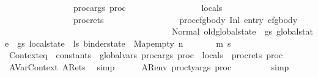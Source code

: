 \begin{isabellebody}
\ \ \ \ \ \ \ \ \ \ \ \ \ \ \ \ proc{\isacharunderscore}{\kern0pt}args\ proc\ {\isacharat}{\kern0pt}\isanewline
\ \ \ \ \ \ \ \ \ \ \ \ \ \ \ \ locals\ {\isacharat}{\kern0pt}\isanewline
\ \ \ \ \ \ \ \ \ \ \ \ \ \ \ \ proc{\isacharunderscore}{\kern0pt}rets\isanewline
\ \ \ \ \ \ \ \ \ \ \ \ \ \ \ \ \ proc{\isacharparenright}{\kern0pt}{\isacharcomma}{\kern0pt}{\isasymGamma}{\isacharcomma}{\kern0pt}{\isasymOmega}{\isacharcomma}{\kern0pt}cfg{\isacharunderscore}{\kern0pt}body\ {\isasymturnstile}{\isacharparenleft}{\kern0pt}Inl\ {\isacharparenleft}{\kern0pt}entry\ cfg{\isacharunderscore}{\kern0pt}body{\isacharparenright}{\kern0pt}{\isacharcomma}{\kern0pt}\isanewline
\ \ \ \ \ \ \ \ \ \ \ \ \ \ \ \ \ \ \ \ \ \ \ \ \ \ \ \ \ \ \ \ \ \ \ \ \ \ \ Normal\ {\isasymlparr}old{\isacharunderscore}{\kern0pt}global{\isacharunderscore}{\kern0pt}state\ {\isacharequal}{\kern0pt}\ gs{\isacharcomma}{\kern0pt}\ global{\isacharunderscore}{\kern0pt}state\ {\isacharequal}{\kern0pt}\ gs{\isacharcomma}{\kern0pt}\ local{\isacharunderscore}{\kern0pt}state\ {\isacharequal}{\kern0pt}\ ls{\isacharcomma}{\kern0pt}\ binder{\isacharunderscore}{\kern0pt}state\ {\isacharequal}{\kern0pt}\ Map{\isachardot}{\kern0pt}empty{\isasymrparr}{\isacharparenright}{\kern0pt}\ {\isacharminus}{\kern0pt}n{\isasymrightarrow}{\isacharasterisk}{\kern0pt}\isanewline
\ \ \ \ \ \ \ {\isacharparenleft}{\kern0pt}m{\isacharprime}{\kern0pt}{\isacharcomma}{\kern0pt}\ s{\isacharprime}{\kern0pt}{\isacharparenright}{\kern0pt}{\isachardoublequoteclose}\isanewline
\ \ \ \ \isamarkupfalse%
\ Contexteq{\isacharcolon}{\kern0pt}{\isachardoublequoteopen}{\isasymLambda}\ {\isacharequal}{\kern0pt}\ {\isacharparenleft}{\kern0pt}constants\ {\isacharat}{\kern0pt}\ global{\isacharunderscore}{\kern0pt}vars{\isacharcomma}{\kern0pt}\ proc{\isacharunderscore}{\kern0pt}args\ proc\ {\isacharat}{\kern0pt}\ locals\ {\isacharat}{\kern0pt}\ proc{\isacharunderscore}{\kern0pt}rets\ proc{\isacharparenright}{\kern0pt}{\isachardoublequoteclose}\isanewline
\ \ \ \ \ \ \isamarkupfalse%
\ AVarContext\ ARets\ \isamarkupfalse%
\ simp\isanewline
\ \ \ \ \isamarkupfalse%
\ ARenv\ {\isacartoucheopen}proc{\isacharunderscore}{\kern0pt}ty{\isacharunderscore}{\kern0pt}args\ proc\ {\isacharequal}{\kern0pt}\ {}{\isacartoucheclose}\ \isamarkupfalse%
\ {\isachardoublequoteopen}{\isasymOmega}\ {\isacharequal}{\kern0pt}\ {\isacharbrackleft}{\kern0pt}{\isacharbrackright}{\kern0pt}{\isachardoublequoteclose}\ \isamarkupfalse%
\ simp\isanewline

\end{isabellebody}
